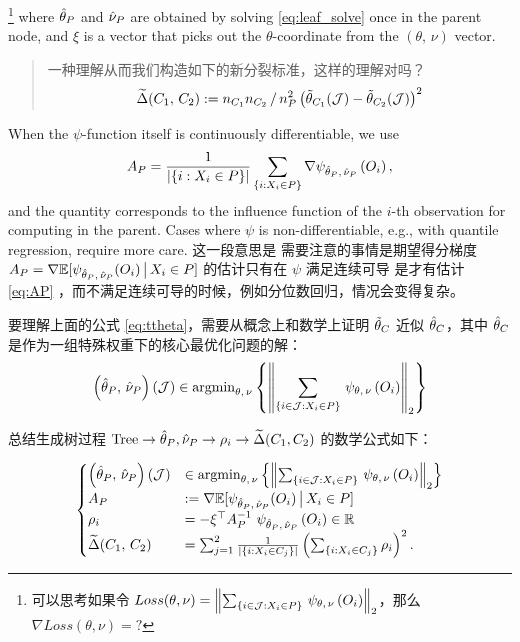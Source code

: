 \documentclass[aos]{imsart}
\theoremstyle{plain}
\theoremstyle{definition}
\theoremstyle{remark}
\begin{document}
\begin{CJK}{UTF8}{gbsn}
\noindent
\footnote{可以思考如果令 $Loss(\theta, \nu) = \left\lVert\sum_{\left\{i\in\mathcal{J} : X_i \in P\right\}} \, \psi_{\theta, \, \nu}\left(O_i\right)\right\rVert_2$，那么 $\nabla Loss(\theta, \nu) = ?$ } where $\hat{\theta}_P$ and $\hat{\nu}_P$ are obtained by solving \eqref{eq:leaf_solve} once in the parent node,
and $\xi$ is a vector that picks out the $\theta$-coordinate from the $(\theta, \, \nu)$ vector.

\begin{quote}
一种理解从而我们构造如下的新分裂标准，这样的理解对吗？
\begin{equation*}
    \tDelta(C_1, \, C_2) := {n_{C_1} n_{C_2}}\,/\,{n_P^2} \p{\ttheta_{C_1}(\mathcal{J}) - \ttheta_{C_2}(\mathcal{J})}^2
\end{equation*}   
\end{quote}



When the $\psi$-function itself is continuously differentiable, we use
\begin{equation}
\label{eq:AP}
A_P= \frac{1}{\abs{\cb{i : X_i \in P}}} \sum_{\cb{i : X_i \in P}} \nabla \psi_{\htheta_P, \, \hnu_P}\p{O_i},
\end{equation}
and the quantity  corresponds
to the influence function of the $i$-th observation for computing  in the parent.
Cases where $\psi$ is non-differentiable, e.g., with quantile regression, require more care. 这一段意思是 需要注意的事情是期望得分梯度 $A_P= \nabla \mathbb{E}[\psi_{\hat{\theta}_P, \, \hat{\nu}_P}(O_i) \,\big|\, X_i \in P]$ 的估计只有在 $\psi$ 满足连续可导 是才有估计 \eqref{eq:AP} ，而不满足连续可导的时候，例如分位数回归，情况会变得复杂。


要理解上面的公式 \eqref{eq:ttheta}，需要从概念上和数学上证明 $\tilde{\theta}_C$ 近似 $\hat{\theta}_C$，其中 $\hat{\theta}_C$ 是作为一组特殊权重下的核心最优化问题的解：
\begin{equation*}
\p{\htheta_P, \, \hnu_P}(\mathcal{J}) \in \argmin_{\theta, \, \nu} \cb{\Norm{\sum_{\cb{i\in\mathcal{J} : X_i \in P}} \, \psi_{\theta, \, \nu}\p{O_i}}_2}    
\end{equation*}

总结生成树过程 $\text{Tree} \to \hat{\theta}_P, \hat{\nu}_P \to \rho_i \to \widetilde{\Delta}(C_1, C_2)$ 的数学公式如下：

$$
\begin{cases}
\p{\htheta_P, \, \hnu_P}(\mathcal{J}) &\in \argmin_{\theta, \, \nu}  \cb{\Norm{\sum_{\cb{i\in\mathcal{J} : X_i \in P}} \, \psi_{\theta, \, \nu}\p{O_i}}_2} \\
A_P &:= \nabla \mathbb{E}[\psi_{\htheta_P, \, \hnu_P}(O_i) \cond X_i \in P] \\
\rho_i &= -\xi^\top A_P^{-1} \ \psi_{\htheta_P, \, \hnu_P}\p{O_i} \in \RR  \\
\tDelta(C_1, \, C_2) &=  \sum_{j = 1}^2\frac{1}{\abs{\cb{i : X_i \in C_j}}}\p{ \sum_{\cb{i : X_i \in C_j}} \rho_i}^2.
\end{cases}
$$


\end{CJK}
\end{document}
